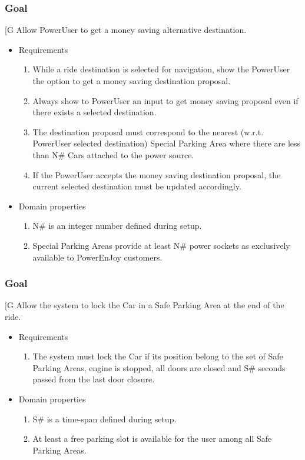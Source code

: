     \subsubsection{Goal }
    {[}G\arabic{goalctr}{]}
    Allow PowerUser to get a money saving alternative destination.
    \begin{itemize}
        \item Requirements
        \begin{enumerate}[REQ]
    			\item While a ride destination is selected for navigation, show the PowerUser the option to get a money saving destination proposal.
    			\item Always show to PowerUser an input to get money saving proposal even if there exists a selected destination.
    			\item The destination proposal must correspond to the nearest (w.r.t. PowerUser selected destination) Special Parking Area where there are less than N\# Cars attached to the power source.
    			\item If the PowerUser accepts the money saving destination proposal, the current selected destination must be updated accordingly.
        \end{enumerate}
        \item Domain properties
        \begin{enumerate}[PRO]
                \item N\# is an integer number defined during setup.
    			\item Special Parking Areas provide at least N\# power sockets as exclusively available to PowerEnJoy customers.
        \end{enumerate}
    \end{itemize}
 
    \subsubsection{Goal }
    {[}G\arabic{goalctr}{]}
    Allow the system to lock the Car in a Safe Parking Area at the end of the ride.
    \begin{itemize}
        \item Requirements
        \begin{enumerate}[REQ]
    			\item The system must lock the Car if its position belong to the set of Safe Parking Areas, engine is stopped, all doors are closed and S\# seconds passed from the last door closure.
        \end{enumerate}
        \item Domain properties
        \begin{enumerate}[PRO]
                \item S\# is a time-span defined during setup.
    			\item At least a free parking slot is available for the user among all Safe Parking Areas.
        \end{enumerate}
    \end{itemize} 
 
